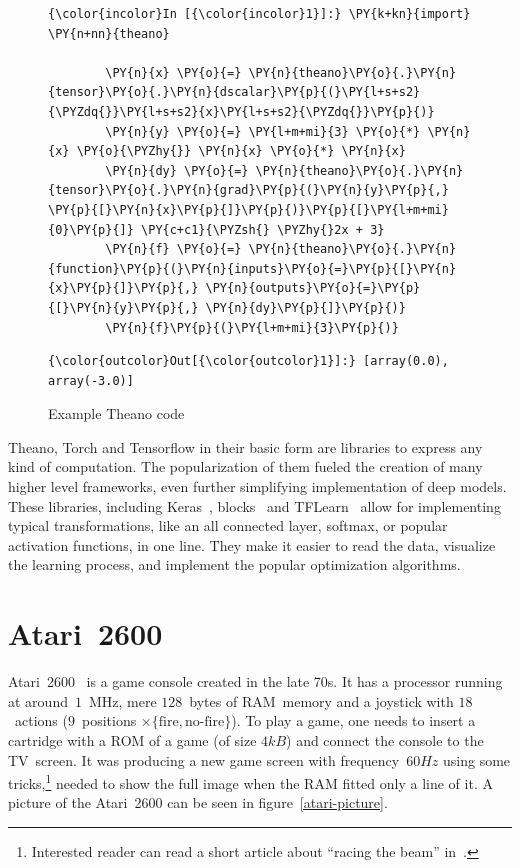 \begin{figure}[!h]
\begin{Verbatim}[commandchars=\\\{\}]
{\color{incolor}In [{\color{incolor}1}]:} \PY{k+kn}{import} \PY{n+nn}{theano}
        
        \PY{n}{x} \PY{o}{=} \PY{n}{theano}\PY{o}{.}\PY{n}{tensor}\PY{o}{.}\PY{n}{dscalar}\PY{p}{(}\PY{l+s+s2}{\PYZdq{}}\PY{l+s+s2}{x}\PY{l+s+s2}{\PYZdq{}}\PY{p}{)}
        \PY{n}{y} \PY{o}{=} \PY{l+m+mi}{3} \PY{o}{*} \PY{n}{x} \PY{o}{\PYZhy{}} \PY{n}{x} \PY{o}{*} \PY{n}{x}
        \PY{n}{dy} \PY{o}{=} \PY{n}{theano}\PY{o}{.}\PY{n}{tensor}\PY{o}{.}\PY{n}{grad}\PY{p}{(}\PY{n}{y}\PY{p}{,} \PY{p}{[}\PY{n}{x}\PY{p}{]}\PY{p}{)}\PY{p}{[}\PY{l+m+mi}{0}\PY{p}{]} \PY{c+c1}{\PYZsh{} \PYZhy{}2x + 3}
        \PY{n}{f} \PY{o}{=} \PY{n}{theano}\PY{o}{.}\PY{n}{function}\PY{p}{(}\PY{n}{inputs}\PY{o}{=}\PY{p}{[}\PY{n}{x}\PY{p}{]}\PY{p}{,} \PY{n}{outputs}\PY{o}{=}\PY{p}{[}\PY{n}{y}\PY{p}{,} \PY{n}{dy}\PY{p}{]}\PY{p}{)}
        \PY{n}{f}\PY{p}{(}\PY{l+m+mi}{3}\PY{p}{)}
\end{Verbatim}

            \begin{Verbatim}[commandchars=\\\{\}]
{\color{outcolor}Out[{\color{outcolor}1}]:} [array(0.0), array(-3.0)]
\end{Verbatim}
              \cprotect\caption{Example Theano code}
              \label{theano-code}
\end{figure}

\renewcommand{\figurename}{Figure}
Theano, Torch and Tensorflow in their basic form are libraries to express any kind of computation. The popularization of them fueled the creation of many higher level frameworks, even further simplifying implementation of deep models. These libraries, including Keras~\cite{keras}, blocks~\cite{blocks} and TFLearn~\cite{tflearn} allow for implementing typical transformations, like an all connected layer, softmax, or popular activation functions, in one line. They make it easier to read the data, visualize the learning process, and implement the popular optimization algorithms.

\section{Atari~2600}
Atari~2600~\cite{atari} is a game console created in the late 70s. It has a processor running at around~$1$~MHz, mere $128$~bytes of RAM~memory and a joystick with $18$~actions ($9$~positions $\times \{\mbox{fire}, \mbox{no-fire}\}$). To play a game, one needs to insert a cartridge with a ROM of a game (of size $4kB$) and connect the console to the TV~screen. It was producing a new game screen with frequency~$60Hz$ using some tricks,\footnote{Interested reader can read a short article about ``racing the beam'' in~\cite{racing-beam}.} needed to show the full image when the RAM fitted only a line of it. A picture of the Atari~2600 can be seen in figure~\ref{atari-picture}.

